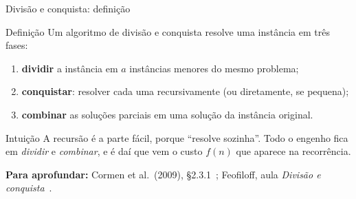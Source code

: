 \documentclass[aspectratio=169,xcolor=table]{beamer}
\newcommand{\fonte}[1]{%
  \vfill
  {\tiny\color{gray!55!black}\textbf{Para aprofundar:} #1\par}%
}
\begin{document}
\begin{frame}{Divisão e conquista: definição}
  \begin{block}{Definição}
    \scriptsize Um algoritmo de divisão e conquista resolve uma instância em três fases:
    \begin{enumerate}\scriptsize
      \item \textbf{dividir} a instância em $a$ instâncias menores do mesmo problema;
      \item \textbf{conquistar}: resolver cada uma recursivamente (ou diretamente, se pequena);
      \item \textbf{combinar} as soluções parciais em uma solução da instância original.
    \end{enumerate}
  \end{block}
  \begin{exampleblock}{Intuição}
    \scriptsize A recursão é a parte fácil, porque ``resolve sozinha''. Todo o engenho
    fica em \emph{dividir} e \emph{combinar}, e é daí que vem o custo $f(n)$
    que aparece na recorrência.
  \end{exampleblock}
  \fonte{Cormen et al.\ (2009), \S 2.3.1~\cite{cormen2009introduction};
    Feofiloff, aula \emph{Divisão e conquista}~\cite{feofiloff2026analise}.}
\end{frame}
\end{document}

